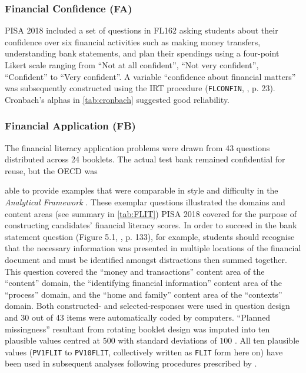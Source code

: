 \subsubsection{Financial Confidence (FA)}

PISA 2018 included a set of questions in \textsf{FL162} asking students about their confidence over six financial activities such as making money transfers, understanding bank statements, and plan their spendings using a four-point Likert scale ranging from ``Not at all confident'', ``Not very confident'', ``Confident'' to ``Very confident''. A variable ``confidence about financial matters'' was subsequently constructed using the IRT procedure (\texttt{FLCONFIN}, \textcite{PISAtech}, p. 23). Cronbach's alphas in \cref{tab:cronbach} suggested good reliability.

\subsubsection{Financial Application (FB)}

The financial literacy application problems were drawn from 43 questions distributed across 24 booklets. The actual test bank remained confidential for reuse, but the OECD was %

\noindent able to provide examples that were comparable in style and difficulty in the \textit{Analytical Framework} \parencite[][pp. 133--148]{PISAframework}. These exemplar questions illustrated the domains and content areas (see summary in \cref{tab:FLIT}) PISA 2018 covered for the purpose of constructing candidates' financial literacy scores. In order to succeed in the bank statement question (Figure 5.1, \textcite{PISAframework}, p. 133), for example, students should recognise that the necessary information was presented in multiple locations of the financial document and must be identified amongst distractions then summed together. This question covered the ``money and transactions'' content area of the ``content'' domain, the ``identifying financial information'' content area of the ``process'' domain, and the ``home and family'' content area of the ``contexts'' domain. Both constructed- and selected-responses were used in question design and 30 out of 43 items were automatically coded by computers. ``Planned missingness'' resultant from rotating booklet design was imputed into ten plausible values \parencite{vondavier:2014} centred at $500$ with standard deviations of $100$ \parencite{PISAframework}. All ten plausible values (\texttt{PV1FLIT} to \texttt{PV10FLIT}, collectively written as \texttt{FLIT} form here on) have been used in subsequent analyses following procedures prescribed by \textcite{rubin:1987}.

